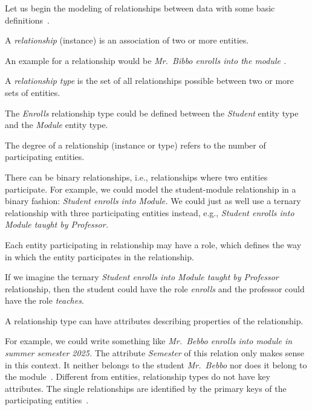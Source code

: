%
%
%
Let us begin the modeling of relationships between data with some basic definitions~\cite{G2011EW2ITDS:CMUTERM}.%
%
\begin{definition}[Relationship]%
A \emph{relationship} (instance) is an association of two or more entities.%
\end{definition}%
%
An example for a relationship would be \emph{Mr.~Bibbo enrolls into the module .}
%
\begin{definition}%
A \emph{relationship type} is the set of all relationships possible between two or more sets of entities.%
\end{definition}%
%
The \emph{Enrolls} relationship type could be defined between the \emph{Student} entity type and the \emph{Module} entity type.%
%
\begin{definition}%
The degree of a relationship (instance or type) refers to the number of participating entities.%
\end{definition}%
%
There can be binary relationships, i.e., relationships where two entities participate.
For example, we could model the student-module relationship in a binary fashion: \emph{Student enrolls into Module.}
We could just as well use a ternary relationship with three participating entities instead, e.g., \emph{Student enrolls into Module taught by Professor.}
%
\begin{definition}%
Each entity participating in relationship may have a role, which defines the way in which the entity participates in the relationship.%
\end{definition}%
%
If we imagine the ternary \emph{Student enrolls into Module taught by Professor} relationship, then the student could have the role \emph{enrolls} and the professor could have the role \emph{teaches}.%
%
\begin{definition}%
A relationship type can have attributes describing properties of the relationship.%
\end{definition}%
%
For example, we could write something like \emph{Mr.~Bebbo enrolls into module  in summer semester 2025.}
The attribute \emph{Semester} of this relation only makes sense in this context.
It neither belongs to the student \emph{Mr.~Bebbo} nor does it belong to the module~.
Different from entities, relationship types do not have key attributes.
The single relationships are identified by the primary keys of the participating entities~\cite{G2011EW2ITDS:CMUTERM}.
%
\endhsection%
%
